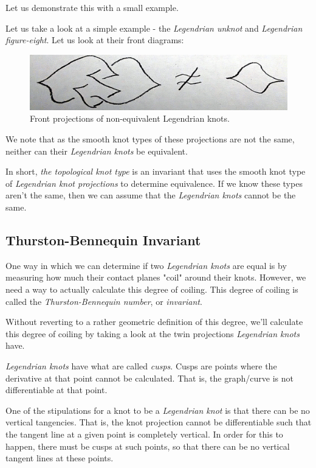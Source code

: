 \documentclass{article}
\begin{document}
Let us demonstrate this with a small example.

Let us take a look at a simple example - the \textit{Legendrian unknot} and
\textit{Legendrian figure-eight}. Let us
look at their front diagrams:
\begin{figure}[h!]
    \includegraphics[width=\linewidth]{notEq.jpg}
    \caption{Front projections of non-equivalent Legendrian knots.}
    \label{fig:knot1}
\end{figure}

We note that as the smooth knot types of these projections are not the same,
neither can their \textit{Legendrian knots} be equivalent.

In short, \textit{the topological knot type} is an invariant that uses the smooth
knot type of \textit{Legendrian knot projections} to determine equivalence. If we
know these types aren't the same, then we can assume that the \textit{Legendrian knots}
cannot be the same.

\subsection{Thurston-Bennequin Invariant}

One way in which we can determine if two \textit{Legendrian knots} are equal
is by measuring how much their contact planes "coil" around their knots. However,
we need a way to actually calculate this degree of coiling. This degree of coiling
is called the \textit{Thurston-Bennequin number}, or \textit{invariant}.

Without reverting to a rather geometric definition of this degree, we'll
calculate this degree of coiling by taking a look at the twin projections
\textit{Legendrian knots} have.

\textit{Legendrian knots} have what are called \textit{cusps}. Cusps are points
where the derivative at that point cannot be calculated. That is, the graph/curve
is not differentiable at that point.

One of the stipulations for a knot to be a \textit{Legendrian knot} is
that there can be no vertical tangencies. That is, the knot projection cannot
be differentiable such that the tangent line at a given point is completely
vertical. In order for this to happen, there must be cusps at such points, so that
there can be no vertical tangent lines at these points.
\end{document}
